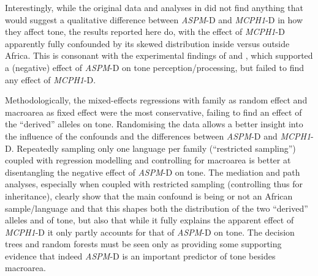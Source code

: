 \documentclass[twoside,onecolumn]{article}
\begin{document}
Interestingly, while the original data and analyses in \citet{dediu_ladd_2007} did not find anything that would suggest a qualitative difference between \textit{ASPM}-D and \textit{MCPH1}-D in how they affect tone, the results reported here do, with the effect of \textit{MCPH1}-D apparently fully confounded by its skewed distribution inside versus outside Africa.
This is consonant with the experimental findings of \citet{wong_plosone_2012} and \citet{wong_sciadv_2020}, which supported a (negative) effect of \textit{ASPM}-D on tone perception/processing, but failed to find any effect of \textit{MCPH1}-D.

Methodologically, the mixed-effects regressions with family as random effect and macroarea as fixed effect were the most conservative, failing to find an effect of the ``derived'' alleles on tone.
Randomising the data allows a better insight into the influence of the confounds and the differences between \textit{ASPM}-D and \textit{MCPH1}-D.
Repeatedly sampling only one language per family (``restricted sampling'') coupled with regression modelling and controlling for macroarea is better at disentangling the negative effect of \textit{ASPM}-D on tone.
The mediation and path analyses, especially when coupled with restricted sampling (controlling thus for inheritance), clearly show that the main confound is being or not an African sample/language and that this shapes both the distribution of the two ``derived'' alleles and of tone, but also that while it fully explains the apparent effect of \textit{MCPH1}-D it only partly accounts for that of \textit{ASPM}-D on tone.
The decision trees and random forests must be seen only as providing some supporting evidence that indeed \textit{ASPM}-D is an important predictor of tone besides macroarea.
\end{document}
